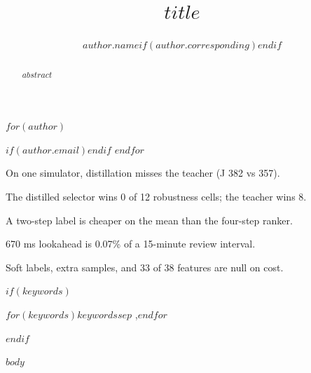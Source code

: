\documentclass[review,3p,times]{elsarticle}
\theoremstyle{definition}
\begin{document}
\begin{frontmatter}

\title{$title$}

$for(author)$
\author[rvce]{$author.name$$if(author.corresponding)$$endif$}
$if(author.email)$$endif$
$endfor$



\begin{abstract}
$abstract$
\end{abstract}

\begin{highlights}
\item On one simulator, distillation misses the teacher (J 382 vs 357).
\item The distilled selector wins 0 of 12 robustness cells; the teacher wins 8.
\item A two-step label is cheaper on the mean than the four-step ranker.
\item 670 ms lookahead is 0.07\% of a 15-minute review interval.
\item Soft labels, extra samples, and 33 of 38 features are null on cost.
\end{highlights}

$if(keywords)$
\begin{keyword}
$for(keywords)$$keywords$$sep$ \sep $endfor$
\end{keyword}
$endif$

\end{frontmatter}

$body$
\end{document}
